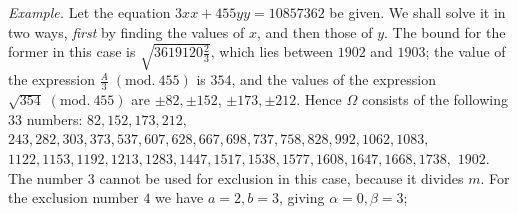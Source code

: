 \textit{Example.} Let the equation \(3xx+455yy=10857362\) be given. We shall solve it in two ways, \textit{first} by finding the values of \(x\), and then those of \(y\). The bound for the former in this case is \(\surd{3619120\frac23}\), which lies between \(1902\) and \(1903\); the value of the expression \(\frac A3\; (\mathrm{mod}.\ 455)\) is \(354\), and the values of the expression \(\surd{354}\; (\mathrm{mod}.\ 455)\) are \(\pm82,\allowbreak \pm152\), \(\pm173,\allowbreak \pm212\). Hence \(\Omega\) consists of the following \(33\) numbers: \(82,\allowbreak 152,\allowbreak 173,\allowbreak 212,\allowbreak \) \(243,\allowbreak 282,\allowbreak 303,\allowbreak 373,\allowbreak 537,\allowbreak 607,\allowbreak 628,\allowbreak 667,\allowbreak 698,\allowbreak 737,\allowbreak 758,\allowbreak 828,\allowbreak 992,\allowbreak 1062,\allowbreak 1083,\allowbreak \) \(1122,\allowbreak 1153,\allowbreak 1192,\allowbreak 1213,\allowbreak 1283,\allowbreak 1447,\allowbreak 1517,\allowbreak 1538,\allowbreak 1577,\allowbreak 1608,\allowbreak 1647,\allowbreak 1668,\allowbreak 1738,\allowbreak \) \(1902\). The number \(3\) cannot be used for exclusion in this case, because it divides \(m\). For the exclusion number \(4\) we have \(a=2,\allowbreak b=3\), giving \(\alpha=0,\allowbreak \beta=3\);
